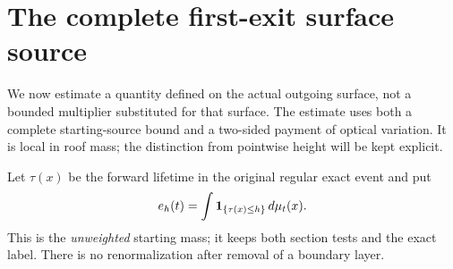 \section{The complete first-exit surface source}
\label{sec:v83-surface}
We now estimate a quantity defined on the actual outgoing surface,
not a bounded multiplier substituted for that surface. The estimate
uses both a complete starting-source bound and a two-sided payment
of optical variation. It is local in roof mass; the distinction from
pointwise height will be kept explicit.

Let $\tau(x)$ be the forward lifetime in the original regular exact
event and put
\begin{equation}\label{eq:v83-unweighted-exit}
 e_h(t)=\int\one_{\{\tau(x)\le h\}}\,d\mu_t(x).
\end{equation}
This is the \emph{unweighted} starting mass; it keeps both section
tests and the exact label. There is no renormalization after removal
of a boundary layer.

